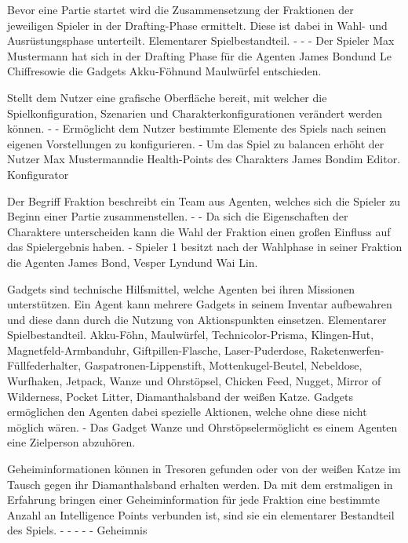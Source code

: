 {Bevor eine Partie startet wird die Zusammensetzung der Fraktionen der jeweiligen Spieler in der Drafting-Phase ermittelt. Diese ist dabei in Wahl- und Ausrüstungsphase unterteilt. }
{Elementarer Spielbestandteil.}
{-}
{-}
{-}
{Der Spieler \glqq Max Mustermann \grqq hat sich in der Drafting Phase für die Agenten \glqq James Bond\grqq und \glqq Le Chiffre\grqq sowie die Gadgets \glqq Akku-Föhn\grqq und \glqq Maulwürfel \grqq entschieden.}

{Stellt dem Nutzer eine grafische Oberfläche bereit, mit welcher die Spielkonfiguration, Szenarien und Charakterkonfigurationen verändert werden können.}
{-}
{-}
{Ermöglicht dem Nutzer bestimmte Elemente des Spiels nach seinen eigenen Vorstellungen zu konfigurieren.}
{-}
{Um das Spiel zu balancen erhöht der Nutzer \glqq Max Mustermann\grqq die Health-Points des Charakters \glqq James Bond\grqq im Editor.}
{Konfigurator}

{Der Begriff Fraktion beschreibt ein Team aus Agenten, welches sich die Spieler zu Beginn einer Partie zusammenstellen. }
{-}
{-}
{Da sich die Eigenschaften der Charaktere unterscheiden kann die Wahl der Fraktion einen großen Einfluss auf das Spielergebnis haben.}
{-}
{Spieler 1 besitzt nach der Wahlphase in seiner Fraktion die Agenten \glqq James Bond\grqq, \glqq Vesper Lynd\grqq und \glqq Wai Lin\grqq.}

{Gadgets sind technische Hilfsmittel, welche Agenten bei ihren Missionen unterstützen. Ein Agent kann mehrere Gadgets in seinem Inventar aufbewahren und diese dann durch die Nutzung von Aktionspunkten einsetzen. }
{Elementarer Spielbestandteil.}
{Akku-Föhn, Maulwürfel, Technicolor-Prisma, Klingen-Hut, Magnetfeld-Armbanduhr, Giftpillen-Flasche, Laser-Puderdose, Raketenwerfen-Füllfederhalter, Gaspatronen-Lippenstift, Mottenkugel-Beutel, Nebeldose, Wurfhaken, Jetpack, Wanze und Ohrstöpsel, Chicken Feed, Nugget, Mirror of Wilderness, Pocket Litter, Diamanthalsband der weißen Katze.}
{Gadgets ermöglichen den Agenten dabei spezielle Aktionen, welche ohne diese nicht möglich wären. }
{-}
{Das Gadget \glqq Wanze und Ohrstöpsel\grqq ermöglicht es einem Agenten eine Zielperson abzuhören.}

{Geheiminformationen können in Tresoren gefunden oder von der weißen Katze im Tausch gegen ihr Diamanthalsband erhalten werden. Da mit dem erstmaligen in Erfahrung bringen einer Geheiminformation für jede Fraktion eine bestimmte Anzahl an Intelligence Points verbunden ist, sind sie ein elementarer Bestandteil des Spiels. }
{-}
{-}
{-}
{-}
{-}
{Geheimnis}

